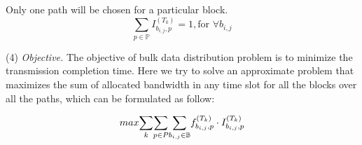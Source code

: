 \begin{packeditemize}
\item Only one path will be chosen for a particular block.
\begin{equation}
\displaystyle{\sum_{p \in \mathbb{P}}} I^{(T_k)}_{b_{i,j},p} = 1, \text{for }\forall b_{i,j}
\end{equation}


\end{packeditemize}


\noindent(4) {\em Objective.} The objective of bulk data distribution problem is to minimize the transmission completion time. Here we try to solve an approximate problem that maximizes the sum of allocated bandwidth in any time slot for all the blocks over all the paths, which can be formulated as follow:

\begin{equation}
\centering
max \displaystyle{\sum_{k}} \displaystyle{\sum_{p\in P}} \displaystyle{\sum_{b_{i,j}\in \mathbb{B}}} f_{b_{i,j},p}^{(T_k)} \cdot I_{b_{i,j},p}^{(T_k)}
\label{equation:objective}
\end{equation}



